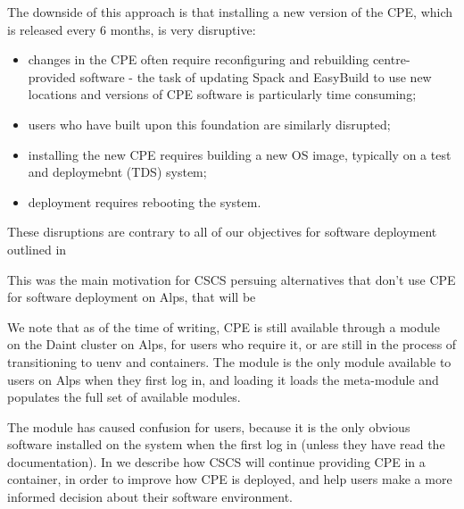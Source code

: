 The downside of this approach is that installing a new version of the CPE, which is released every 6 months, is very disruptive:
\begin{itemize}
    \item changes in the CPE often require reconfiguring and rebuilding centre-provided software - the task of updating Spack and EasyBuild to use new locations and versions of CPE software is particularly time consuming;
    \item users who have built upon this foundation are similarly disrupted;
    \item installing the new CPE requires building a new OS image, typically on a test and deploymebnt (TDS) system;
    \item deployment requires rebooting the system.
\end{itemize}
These disruptions are contrary to all of our objectives for software deployment outlined in~

This was the main motivation for CSCS persuing alternatives that don't use CPE for software deployment on Alps, that will be

We note that as of the time of writing, CPE is still available through a  module on the Daint cluster on Alps, for users who require it, or are still in the process of transitioning to uenv and containers.
The  module is the only module available to users on Alps when they first log in, and loading it loads the  meta-module and populates the full set of available modules.

The module has caused confusion for users, because it is the only obvious software installed on the system when the first log in (unless they have read the documentation).
In  we describe how CSCS will continue providing CPE in a container, in order to improve how CPE is deployed, and help users make a more informed decision about their software environment.
